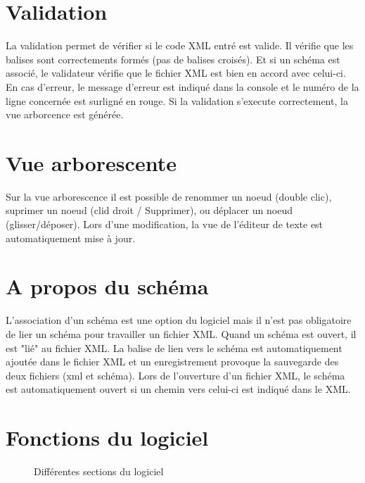 \section{Validation}
La validation permet de vérifier si le code XML entré est valide.
Il vérifie que les balises sont correctements formés (pas de balises croisés).
Et si un schéma est associé, le validateur vérifie que le fichier XML est bien en accord avec celui-ci.
En cas d'erreur, le message d'erreur est indiqué dans la console et le numéro de la ligne concernée est surligné en rouge.
Si la validation s'execute correctement, la vue arborcence est générée.

\section{Vue arborescente}
Sur la vue arborescence il est possible de renommer un noeud (double clic), suprimer un noeud (clid droit / Supprimer), ou déplacer un noeud (glisser/déposer).
Lors d'une modification, la vue de l'éditeur de texte est automatiquement mise à jour.

\section{A propos du schéma}
L'association d'un schéma est une option du logiciel mais il n'est pas obligatoire de lier un schéma pour travailler un fichier XML.
Quand un schéma est ouvert, il est "lié" au fichier XML. La balise de lien vers le schéma est automatiquement ajoutée dans le fichier XML
et un enregistrement provoque la sauvegarde des deux fichiers (xml et schéma).
Lors de l'ouverture d'un fichier XML, le schéma est automatiquement ouvert si un chemin vers celui-ci est indiqué dans le XML.

\section{Fonctions du logiciel}


\begin{figure}[h!]
\noindent{}
\caption{Différentes sections du logiciel}
\end{figure}